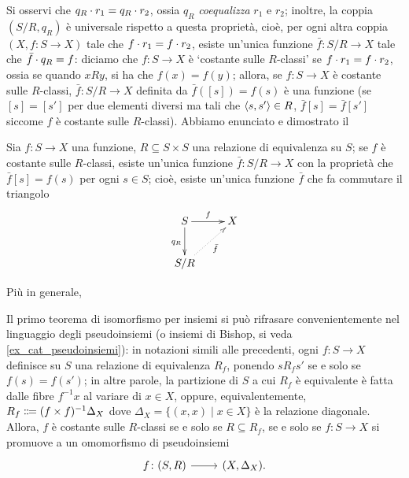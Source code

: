 Si osservi che \(q_R\cdot r_1=q_R\cdot r_2\), ossia \(q_R\) \emph{coequalizza} \(r_1\) e \(r_2\); inoltre, la coppia \((S/R,q_R)\) è universale rispetto a questa proprietà, cioè, per ogni altra coppia \((X,f\colon S\to X)\) tale che \(f\cdot r_1=f\cdot r_2 \), esiste un'unica funzione \(\bar f\colon S/R\to X\) tale che \(\bar f\cdot q_R= f\):%
diciamo che \(f \colon S\to X\) è `costante sulle \(R\)-classi' se \(f\cdot r_1=f\cdot r_2 \), ossia se quando \(xRy\), si ha che \(f(x)=f(y)\); allora, se \(f \colon S\to X\) è costante sulle \(R\)-classi, \(\bar f\colon S/R \to X\) definita da \(\bar f([s])= f(s)\) è una funzione (se \([s]=[s']\) per due elementi diversi ma tali che \(\langle s,s'\rangle\in R\), \(\bar f[s]=\bar f[s']\) siccome \(f\) è costante sulle \(R\)-classi). Abbiamo enunciato e dimostrato il
\begin{theorem}
 Sia \(f \colon S\to X\) una funzione, \(R\subseteq S\times S\) una relazione di equivalenza su \(S\); se \(f\) è costante sulle \(R\)-classi, esiste un'unica funzione \(\bar f \colon S/R \to X\) con la proprietà che \(\bar f[s]=f(s)\) per ogni \(s\in S\); cioè, esiste un'unica funzione \(\bar f\) che fa commutare il triangolo
 \[\xymatrix{
  S \ar[d]_{q_R}\ar[r]^-f & X \\
  S/R\ar@{.>}[ur]_-{\bar f}
  }\]
\end{theorem}
\Todo{}
Più in generale,
\begin{definition}\label{rel_equiv_generata}
\end{definition}
\begin{remark}
 Il primo teorema di isomorfismo per insiemi si può rifrasare convenientemente nel linguaggio degli pseudoinsiemi (o insiemi di Bishop, si veda \ref{ex_cat_pseudoinsiemi}): in notazioni simili alle precedenti, ogni \(f \colon S\to X\) definisce su \(S\) una relazione di equivalenza \(R_f\), ponendo \(s R_f s'\) se e solo se \(f(s)=f(s')\); in altre parole, la partizione di \(S\) a cui \(R_f\) è equivalente è fatta dalle fibre \(f^{-1}x\) al variare di \(x\in X\), oppure, equivalentemente, \(R_f \defeq (f\times f)^{-1}\Delta_X\) dove \(\Delta_X = \{(x,x)\mid x\in X\}\) è la relazione diagonale. Allora, \(f\) è costante sulle \(R\)-classi se e solo se \(R\subseteq R_f\), se e solo se \(f \colon S\to X\) si promuove a un omomorfismo di pseudoinsiemi
 \[\dmFun{f}{(S,R)}{(X,\Delta_X).}\]
\end{remark}
